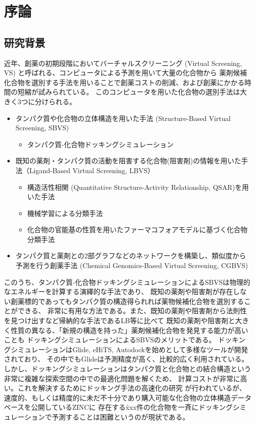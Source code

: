 \chapter{序論}
\section{研究背景}\label{sec:background}
近年、創薬の初期段階においてバーチャルスクリーニング (Virtual Screening, VS) と呼ばれる、コンピュータによる予測を用いて大量の化合物から
薬剤候補化合物を選別する手法を用いることで創薬コストの削減、および創薬にかかる時間の短縮が試みられている。
このコンピュータを用いた化合物の選別手法は大きく3つに分けられる。

\begin{itemize}
\item タンパク質や化合物の立体構造を用いた手法 (Structure-Based Virtual Screening, SBVS)
	\begin{itemize}
	\item タンパク質-化合物ドッキングシミュレーション
	\end{itemize}
\item 既知の薬剤・タンパク質の活動を阻害する化合物(阻害剤)の情報を用いた手法（Ligand-Based Virtual Screening, LBVS）
	\begin{itemize}
	\item 構造活性相関 (Quantitative Structure-Activity Relationship, QSAR)を用いた手法\citetodo{}
	\item 機械学習による分類手法\citetodo{}
	\item 化合物の官能基の性質を用いたファーマコフォアモデルに基づく化合物分類手法\citetodo{}
	\end{itemize}
\item タンパク質と薬剤との2部グラフなどのネットワークを構築し、類似度から予測を行う創薬手法 
	(Chemical Genomics-Based Virtual Screening, CGBVS)
\end{itemize}

このうち、タンパク質-化合物ドッキングシミュレーションによるSBVSは物理的なエネルギーを計算する演繹的な手法であり、
既知の薬剤や阻害剤が存在しない創薬標的であってもタンパク質の構造得られれば薬物候補化合物を選別することができる、
非常に有用な方法である。また、既知の薬剤や阻害剤から法則性を見つけ出すなど帰納的な手法であるLB等に比べて
既知の薬剤や阻害剤と大きく性質の異なる、「新規の構造を持った」薬剤候補化合物を発見する能力が高いことも
ドッキングシミュレーションによるSBVSのメリットである。
ドッキングシミュレーションはGlide\citetodo{}, eHiTS\citetodo{}, Autodock\citetodo{}を始めとして多様なツールが開発されており、
その中でもGlideは予測精度が高く、比較的広く利用されている。
しかし、ドッキングシミュレーションはタンパク質と化合物との結合構造という非常に複雑な探索空間の中での最適化問題を解くため、
計算コストが非常に高い。これを解決するためにドッキング手法の高速化の研究
が行われているが、速度的、もしくは精度的に未だ不十分であり購入可能な化合物の立体構造データベースを公開しているZINC\citetodo{}に
存在する\r{xxx件}の化合物を一斉にドッキングシミュレーションで予測することは困難というのが現状である。

